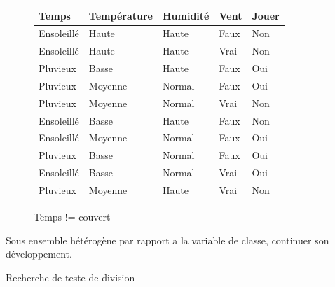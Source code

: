 \documentclass[a4paper, 11pt]{report}
\begin{document}
\begin{figure}[!h]
\caption{Temps != couvert}
\label{ens2}
\begin{center}
\begin{tabular}{| l | l | l | l | l |}
\hline
\rowcolor{gray!25}
Temps & Température & Humidité & Vent & Jouer \\
\hline
Ensoleillé & Haute & Haute & Faux & \cellcolor{green}Non \\
\hline
Ensoleillé & Haute & Haute & Vrai & \cellcolor{green}Non \\
\hline
Pluvieux & Basse & Haute & Faux & \cellcolor{yellow}Oui \\
\hline
Pluvieux & Moyenne & Normal & Faux & \cellcolor{yellow}Oui \\
\hline
Pluvieux & Moyenne & Normal & Vrai &  \cellcolor{green}Non \\
\hline
Ensoleillé & Basse & Haute & Faux &  \cellcolor{green}Non \\
\hline
Ensoleillé & Moyenne & Normal & Faux &  \cellcolor{yellow}Oui \\
\hline
Pluvieux & Basse & Normal & Faux &  \cellcolor{yellow}Oui \\
\hline
Ensoleillé & Basse & Normal & Vrai &  \cellcolor{yellow}Oui \\
\hline
Pluvieux & Moyenne & Haute & Vrai &  \cellcolor{green}Non \\
\hline
\end{tabular}
\end{center}
\end{figure}
Sous ensemble hétérogène par rapport a la variable de classe, continuer son développement.

Recherche de teste de division
\end{document}
